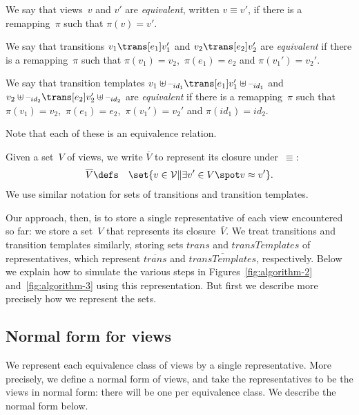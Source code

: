 
\begin{definition}
We say that views~$v$ and $v'$ are \emph{equivalent}, written $v \equiv v'$,
if there is a remapping~$\pi$ such that $\pi(v) = v'$. 

We say that transitions $v_1 \trans[e_1] v_1'$ and $v_2 \trans[e_2] v_2'$ are
\emph{equivalent} if there is a remapping~$\pi$ such that $\pi(v_1) = v_2$,\,
$\pi(e_1) = e_2$ and $\pi(v_1') = v_2'$.

We say that transition templates $v_1 \uplus \hole{id_1} \trans[e_1] v_1'
\uplus \hole{id_1}$ and $v_2 \uplus \hole{id_2} \trans[e_2] v_2' \uplus
\hole{id_2}$ are \emph{equivalent} if there is a remapping~$\pi$ such that
$\pi(v_1) = v_2$,\, $\pi(e_1) = e_2$,\, $\pi(v_1') = v_2'$ and $\pi(id_1) = id_2$.

Note that each of these is an equivalence relation.

Given a set~$V$ of views, we write $\overline{V}$ to represent its closure
under~$\equiv$:
%
\begin{eqnarray*}
\overline{V} & \defs & \set{v \in \V \| \exists v' \in V \spot v \equiv v'}.
\end{eqnarray*}
%
We use similar notation for sets of transitions and transition templates.
\end{definition}



Our approach, then, is to store a single representative of each view
encountered so far: we store a set~$V$ that represents its
closure~$\overline{V}$.  We treat transitions and transition templates
similarly, storing sets $trans$ and $transTemplates$ of representatives, which
represent $\overline{trans}$ and $\overline{transTemplates}$, respectively.
%
Below we explain how to simulate the various steps in
Figures~\ref{fig:algorithm-2} and~\ref{fig:algorithm-3} using this
representation. 
%
But first we describe more precisely how we represent the sets. 




\subsection{Normal form for views}

We represent each equivalence class of views by a single representative.  More
precisely, we define a normal form of views, and take the representatives to
be the views in normal form: there will be one per equivalence class.  We
describe the normal form below. 

